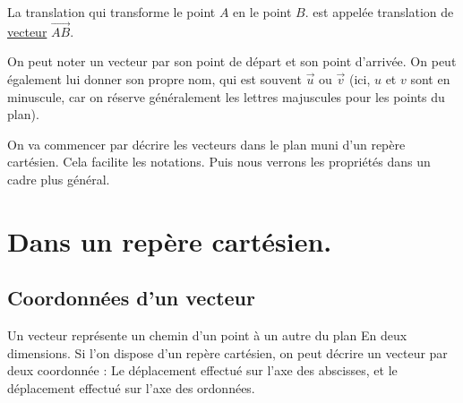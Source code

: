 \documentclass[10pt,a4paper,oneside]{book}
\begin{document}
\begin{de}[Vecteur]
La translation qui transforme le point $A$ en le point $B$. est appelée translation de \underline{vecteur} $\overrightarrow{AB}$.
\end{de}

On peut noter un vecteur par son point de départ et son point d'arrivée. On peut également lui donner son propre nom, qui est souvent $\overrightarrow{u}$ ou $\overrightarrow{v}$ (ici, $u$ et $v$ sont en minuscule, car on réserve généralement les lettres majuscules  pour les points du plan).

\begin{center}
\end{center}

On va commencer par décrire les vecteurs dans le plan muni d'un repère cartésien. Cela facilite les notations. Puis nous verrons les propriétés dans un cadre plus général.

\section{Dans un repère cartésien.}

\subsection{Coordonnées d'un vecteur}

Un vecteur représente un chemin d'un point à un autre du plan En deux dimensions. Si l'on dispose d'un repère cartésien, on peut décrire un vecteur par deux coordonnée : Le déplacement effectué sur l'axe des abscisses, et le déplacement effectué sur l'axe des ordonnées.



\newcommand*{\Coord}[2]{%
  \ensuremath{ 
    \begin{pmatrix} 
      #1\\ 
      #2 
    \end{pmatrix}}}
\end{document}
